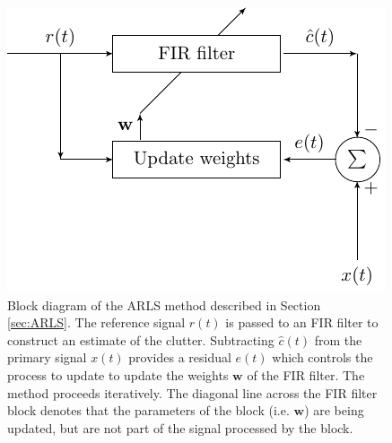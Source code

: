 \documentclass[pra,superscriptaddress,reprint,amsmath,amssymb,nofootinbib]{revtex4-2}
\begin{document}
\begin{figure}
	\begin{center}
		\includegraphics[width=\columnwidth]{images/fir_block_2.pdf}
	\end{center}
	\caption{Block diagram of the ARLS method described in Section \ref{sec:ARLS}. The reference signal $r(t)$ is passed to an FIR filter to construct an estimate of the clutter. Subtracting $\hat{c}(t)$ from the primary signal $x(t)$ provides a residual $e(t)$ which controls the process to update to update the weights $\mathbf{w}$ of the FIR filter. The method proceeds iteratively. The diagonal line across the FIR filter block denotes that the parameters of the block (i.e. $\mathbf{w}$) are being updated, but are not part of the signal processed by the block.}
	\label{fig:arlsBlock}
\end{figure}
\end{document}
